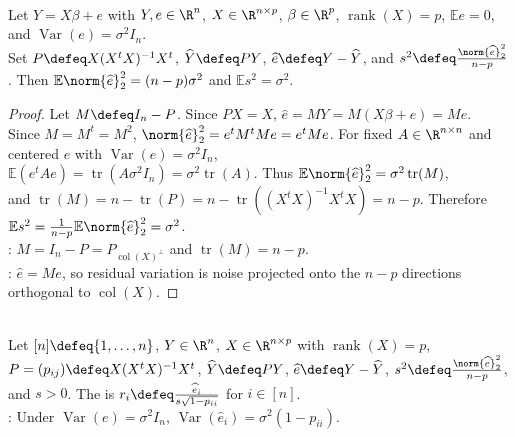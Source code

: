 \begin{theorem} \label{thm:linear-model-unbiased-error-variance} \\
Let $Y=X\beta+e$ with $Y,e\in\R^n$, $X\in\R^{n\times p}$, $\beta\in\R^p$, $\operatorname{rank}(X)=p$, $\mathbb{E}e=0$, and $\operatorname{Var}(e)=\sigma^2I_n$.\\
Set $P\defeq X(X^tX)^{-1}X^t$, $\widehat{Y}\defeq PY$, $\widehat{e}\defeq Y-\widehat{Y}$, and $s^2\defeq\frac{\norm{\widehat{e}}_2^2}{n-p}$. Then $\mathbb{E}\norm{\widehat{e}}_2^2=(n-p)\sigma^2$ and $\mathbb{E}s^2=\sigma^2$.
\begin{proof} Let $M\defeq I_n-P$. Since $PX=X$, $\widehat{e}=MY=M(X\beta+e)=Me$.\\
Since $M=M^t=M^2$, $\norm{\widehat{e}}_2^2=e^tM^tMe=e^tMe$. For fixed $A\in\R^{n\times n}$ and centered $e$ with $\operatorname{Var}(e)=\sigma^2I_n$,\\
$\mathbb{E}(e^tAe)=\operatorname{tr}(A\sigma^2I_n)=\sigma^2\operatorname{tr}(A)$. Thus $\mathbb{E}\norm{\widehat{e}}_2^2=\sigma^2\operatorname{tr}(M)$,\\
and $\operatorname{tr}(M)=n-\operatorname{tr}(P)=n-\operatorname{tr}((X^tX)^{-1}X^tX)=n-p$.
Therefore $\mathbb{E}s^2=\frac{1}{n-p}\mathbb{E}\norm{\widehat{e}}_2^2=\sigma^2$.\\
: $M=I_n-P=P_{\operatorname{col}(X)^\perp}$ and $\operatorname{tr}(M)=n-p$.\\
: $\widehat{e}=Me$, so residual variation is noise projected onto the $n-p$ directions orthogonal to $\operatorname{col}(X)$.
\end{proof}
\end{theorem}

\begin{definition} \label{def:standardized-residual-linear-model} \\
Let $[n]\defeq\{1,\ldots,n\}$, $Y\in\R^n$, $X\in\R^{n\times p}$ with $\operatorname{rank}(X)=p$, $P=(p_{ij})\defeq X(X^tX)^{-1}X^t$, $\widehat{Y}\defeq PY$, $\widehat{e}\defeq Y-\widehat{Y}$, $s^2\defeq\frac{\norm{\widehat{e}}_2^2}{n-p}$, and $s>0$. The  is $r_i\defeq\frac{\widehat{e}_i}{s\sqrt{1-p_{ii}}}$ for $i\in[n]$.\\
: Under $\operatorname{Var}(e)=\sigma^2I_n$, $\operatorname{Var}(\widehat{e}_i)=\sigma^2(1-p_{ii})$.
\end{definition}

